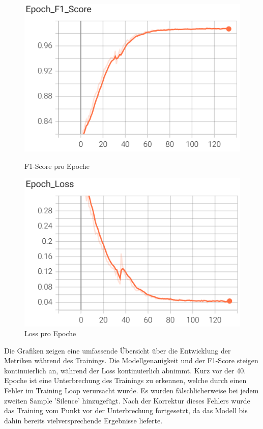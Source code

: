 \documentclass[11pt,a4paper]{article}
\begin{document}
\begin{figure}[H]
    \centering
    \begin{minipage}{0.48\textwidth}
        \includegraphics[width=\textwidth]{img/train/epoch_f1.png}
        \caption{F1-Score pro Epoche}
        \label{fig:epoch_f1}
    \end{minipage}\hfill
    \begin{minipage}{0.48\textwidth}
        \includegraphics[width=\textwidth]{img/train/epoch_loss.png}
        \caption{Loss pro Epoche}
        \label{fig:epoch_loss}
    \end{minipage}
\end{figure}


\noindent \newline
Die Grafiken zeigen eine umfassende Übersicht über die Entwicklung der Metriken während des 
Trainings. Die Modellgenauigkeit und der F1-Score steigen kontinuierlich an, während der Loss 
kontinuierlich abnimmt. Kurz vor der 40. Epoche ist eine Unterbrechung des Trainings zu erkennen,
welche durch einen Fehler im Training Loop verursacht wurde. Es wurden fälschlicherweise bei jedem 
zweiten Sample 'Silence' hinzugefügt. Nach der Korrektur dieses Fehlers wurde das Training vom 
Punkt vor der Unterbrechung fortgesetzt, da das Modell bis dahin bereits vielversprechende 
Ergebnisse lieferte.
\end{document}
